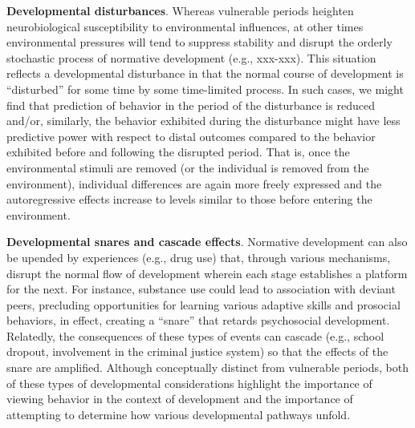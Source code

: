 \documentclass[
  letterpaper,
  DIV=11,
  numbers=noendperiod]{scrartcl}
\begin{document}
\textbf{Developmental disturbances}. Whereas vulnerable periods heighten
neurobiological susceptibility to environmental influences, at other
times environmental pressures will tend to suppress stability and
disrupt the orderly stochastic process of normative development (e.g.,
xxx-xxx). This situation reflects a developmental disturbance in that
the normal course of development is ``disturbed'' for some time by some
time-limited process. In such cases, we might find that prediction of
behavior in the period of the disturbance is reduced and/or, similarly,
the behavior exhibited during the disturbance might have less predictive
power with respect to distal outcomes compared to the behavior exhibited
before and following the disrupted period. That is, once the
environmental stimuli are removed (or the individual is removed from the
environment), individual differences are again more freely expressed and
the autoregressive effects increase to levels similar to those before
entering the environment.

\textbf{Developmental snares and cascade effects}. Normative development
can also be upended by experiences (e.g., drug use) that, through
various mechanisms, disrupt the normal flow of development wherein each
stage establishes a platform for the next. For instance, substance use
could lead to association with deviant peers, precluding opportunities
for learning various adaptive skills and prosocial behaviors, in effect,
creating a ``snare'' that retards psychosocial development. Relatedly,
the consequences of these types of events can cascade (e.g., school
dropout, involvement in the criminal justice system) so that the effects
of the snare are amplified. Although conceptually distinct from
vulnerable periods, both of these types of developmental considerations
highlight the importance of viewing behavior in the context of
development and the importance of attempting to determine how various
developmental pathways unfold.
\end{document}
